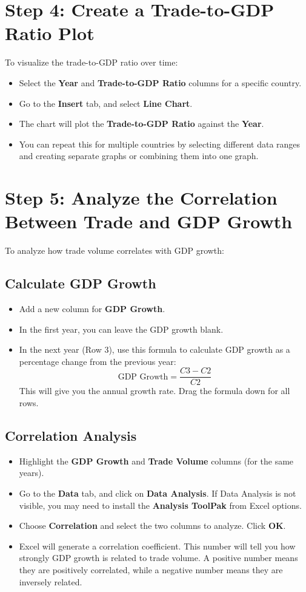 \documentclass{article}
\begin{document}
\section{Step 4: Create a Trade-to-GDP Ratio Plot}
To visualize the trade-to-GDP ratio over time:

\begin{itemize}
    \item Select the \textbf{Year} and \textbf{Trade-to-GDP Ratio} columns for a specific country.
    \item Go to the \textbf{Insert} tab, and select \textbf{Line Chart}.
    \item The chart will plot the \textbf{Trade-to-GDP Ratio} against the \textbf{Year}.
    \item You can repeat this for multiple countries by selecting different data ranges and creating separate graphs or combining them into one graph.
\end{itemize}

\section{Step 5: Analyze the Correlation Between Trade and GDP Growth}
To analyze how trade volume correlates with GDP growth:

\subsection{Calculate GDP Growth}
\begin{itemize}
    \item Add a new column for \textbf{GDP Growth}.
    \item In the first year, you can leave the GDP growth blank.
    \item In the next year (Row 3), use this formula to calculate GDP growth as a percentage change from the previous year:
    \[
    \text{GDP Growth} = \frac{C3 - C2}{C2}
    \]
    This will give you the annual growth rate. Drag the formula down for all rows.
\end{itemize}

\subsection{Correlation Analysis}
\begin{itemize}
    \item Highlight the \textbf{GDP Growth} and \textbf{Trade Volume} columns (for the same years).
    \item Go to the \textbf{Data} tab, and click on \textbf{Data Analysis}. If Data Analysis is not visible, you may need to install the \textbf{Analysis ToolPak} from Excel options.
    \item Choose \textbf{Correlation} and select the two columns to analyze. Click \textbf{OK}.
    \item Excel will generate a correlation coefficient. This number will tell you how strongly GDP growth is related to trade volume. A positive number means they are positively correlated, while a negative number means they are inversely related.
\end{itemize}
\end{document}
